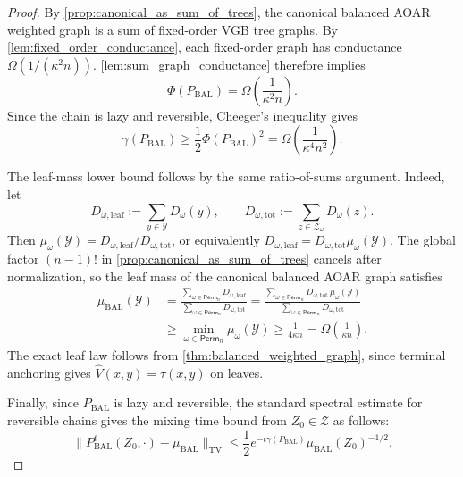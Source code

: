 \documentclass{article}
\numberwithin{theorem}{section}
\numberwithin{proposition}{section}
\numberwithin{corollary}{section}
\numberwithin{lemma}{section}
\numberwithin{conjecture}{section}
\numberwithin{remark}{section}
\numberwithin{definition}{section}
\numberwithin{assumption}{section}
\numberwithin{example}{section}
\newcommand{\calY}{{\mathcal{Y}}}
\newcommand{\calZ}{{\mathcal{Z}}}
\newcommand{\sbra}[1]{\left(#1\right)}
\newcommand{\norm}[1]{\lVert#1\rVert}
\begin{document}
\begin{proof}
By \cref{prop:canonical_as_sum_of_trees}, the canonical balanced AOAR weighted graph is a sum of fixed-order VGB tree graphs. By \cref{lem:fixed_order_conductance}, each fixed-order graph has conductance $\Omega(1/(\kappa^2 n))$. \cref{lem:sum_graph_conductance} therefore implies
\begin{equation*}
    \Phi(P_{\mathrm{BAL}}) = \Omega\sbra{\frac{1}{\kappa^2 n}}.
\end{equation*}
Since the chain is lazy and reversible, Cheeger's inequality \citep{levin2017markov} gives
\begin{equation*}
    \gamma(P_{\mathrm{BAL}})\ge \frac12 \Phi(P_{\mathrm{BAL}})^2=\Omega\sbra{\frac{1}{\kappa^4 n^2}}.
\end{equation*}

The leaf-mass lower bound follows by the same ratio-of-sums argument. Indeed, let
\begin{equation*}
    D_{\omega,\mathrm{leaf}}:=\sum_{y\in\calY}D_\omega(y), \qquad
    D_{\omega,\mathrm{tot}}:=\sum_{z\in\calZ_\omega}D_\omega(z).
\end{equation*}
Then $\mu_\omega(\calY)=D_{\omega,\mathrm{leaf}}/D_{\omega,\mathrm{tot}}$, or equivalently $D_{\omega,\mathrm{leaf}}=D_{\omega,\mathrm{tot}}\mu_\omega(\calY)$.
The global factor $(n-1)!$ in \cref{prop:canonical_as_sum_of_trees} cancels after normalization, so the leaf mass of the canonical balanced AOAR graph satisfies
\begin{align*}
    \mu_{\mathrm{BAL}}(\calY)
    &=\frac{\sum_{\omega\in\mathsf{Perm}_n}D_{\omega,\mathrm{leaf}}}
    {\sum_{\omega\in\mathsf{Perm}_n}D_{\omega,\mathrm{tot}}}
    =\frac{\sum_{\omega\in\mathsf{Perm}_n}D_{\omega,\mathrm{tot}}\,\mu_\omega(\calY)}
    {\sum_{\omega\in\mathsf{Perm}_n}D_{\omega,\mathrm{tot}}} \\
    &\ge \min_{\omega\in\mathsf{Perm}_n}\mu_\omega(\calY)
    \ge \frac{1}{4\kappa n}
    =\Omega\sbra{\frac{1}{\kappa n}}.
\end{align*}
The exact leaf law follows from \cref{thm:balanced_weighted_graph}, since terminal anchoring gives $\widehat V(x,y)=\tau(x,y)$ on leaves.

Finally, since $P_{\mathrm{BAL}}$ is lazy and reversible, the standard spectral estimate for reversible chains \citep{levin2017markov} gives the mixing time bound from $Z_0\in \calZ$ as follows:
\begin{equation*}
    \norm{P_{\mathrm{BAL}}^t(Z_0,\cdot)-\mu_{\mathrm{BAL}}}_{\mathrm{TV}}
    \le \frac12 e^{-t\gamma(P_{\mathrm{BAL}})}\mu_{\mathrm{BAL}}(Z_0)^{-1/2}.
\end{equation*}


\end{proof}
\end{document}
